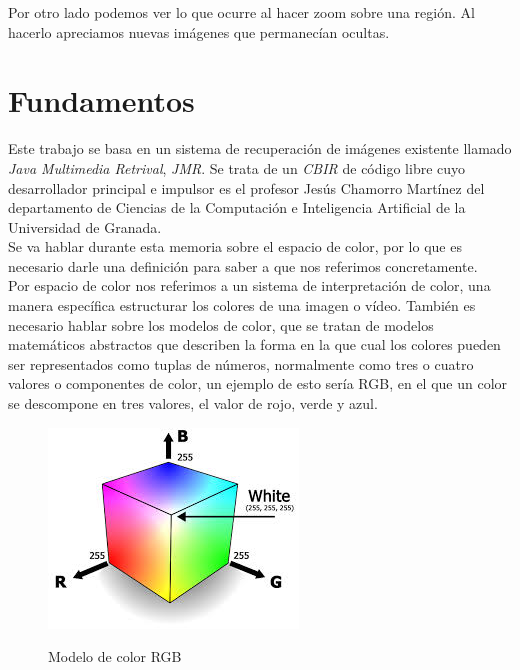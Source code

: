 Por otro lado podemos ver lo que ocurre al hacer zoom sobre una región. Al hacerlo apreciamos nuevas imágenes que permanecían ocultas.\\


\section{Fundamentos}

Este trabajo se basa en un sistema de recuperación de imágenes existente llamado \textit{Java Multimedia Retrival}, \textit{JMR}. Se trata de un \textit{CBIR} de código libre cuyo desarrollador principal e impulsor es el profesor Jesús Chamorro Martínez del departamento de Ciencias de la Computación e Inteligencia Artificial de la Universidad de Granada.\\

Se va hablar durante esta memoria sobre el espacio de color, por lo que es necesario darle una definición para saber a que nos referimos concretamente.\\

Por espacio de color nos referimos a un sistema de interpretación de color, una manera específica estructurar los colores de una imagen o vídeo. También es necesario hablar sobre los modelos de color, que se tratan de modelos matemáticos abstractos que describen la forma en la que cual los colores pueden ser representados como tuplas de números, normalmente como tres o cuatro valores o componentes de color, un ejemplo de esto sería RGB, en el que un color se descompone en tres valores, el valor de rojo, verde y azul.\\


\begin{figure}[H] %
\centering
\includegraphics[scale=0.7]{imagenes/rgb.jpeg}  %
\label{rgb.jpeg}
\caption{Modelo de color RGB}
\end{figure}

